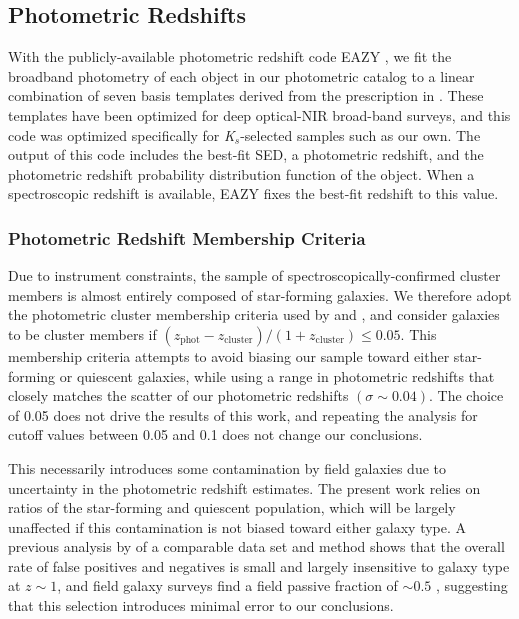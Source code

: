 \subsection{Photometric Redshifts}\label{sec-eazy}

With the publicly-available photometric redshift code EAZY \citep{Brammer:2008uk}, we fit the broadband photometry of each object in our photometric catalog to a linear combination of seven basis templates derived from the prescription in \citet{Blanton:2007ft}.
These templates have been optimized for deep optical-NIR broad-band surveys, and this code was optimized specifically for \textit{K$_s$}-selected samples such as our own.
The output of this code includes the best-fit SED, a photometric redshift, and the photometric redshift probability distribution function of the object.
When a spectroscopic redshift is available, EAZY fixes the best-fit redshift to this value.

\subsubsection{Photometric Redshift Membership Criteria}\label{sec-members}

Due to instrument constraints, the sample of spectroscopically-confirmed cluster members is almost entirely composed of star-forming galaxies.
We therefore adopt the photometric cluster membership criteria used by \citet{van-der-Burg:2013aa} and \citet{Nantais:2016aa,Nantais:2017aa}, and consider galaxies to be cluster members if $(z_{\mathrm{phot}}-z_{\mathrm{cluster}})/(1+z_{\mathrm{cluster}}) \leq 0.05$.
This membership criteria attempts to avoid biasing our sample toward either star-forming or quiescent galaxies, while using a range in photometric redshifts that closely matches the scatter of our photometric redshifts $(\sigma \sim 0.04)$.
The choice of 0.05 does not drive the results of this work, and repeating the analysis for cutoff values between 0.05 and 0.1 does not change our conclusions.

This necessarily introduces some contamination by field galaxies due to uncertainty in the photometric redshift estimates.
The present work relies on ratios of the star-forming and quiescent population, which will be largely unaffected if this contamination is not biased toward either galaxy type.
A previous analysis by \citet{van-der-Burg:2013aa} of a comparable data set and method shows that the overall rate of false positives and negatives is small and largely insensitive to galaxy type at $z\sim1$, and field galaxy surveys find a field passive fraction of $\sim0.5$  \citep[][, see also Appendix \ref{sec-a-field}]{Muzzin:2013aa}, suggesting that this selection introduces minimal error to our conclusions.



